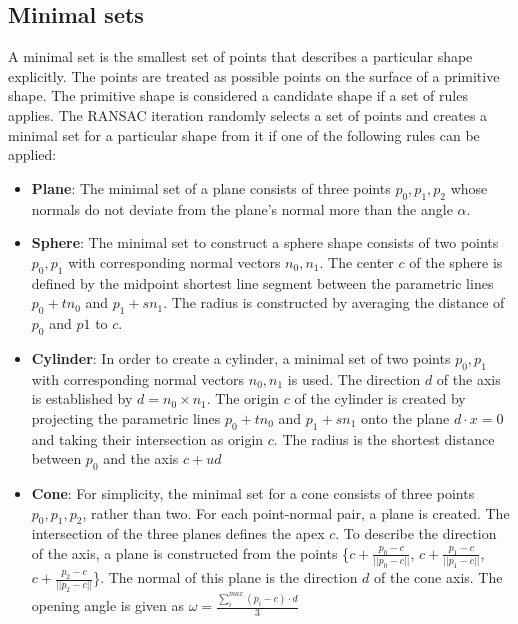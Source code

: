 \subsection{Minimal sets}
\label{sec:minimal_sets}

A minimal set is the smallest set of points that describes a particular shape explicitly. The points are treated as possible points on the surface of a primitive shape. The primitive shape is considered a candidate shape if a set of rules applies. The RANSAC iteration randomly selects a set of points and creates a minimal set for a particular shape from it if one of the following rules can be applied:
\begin{itemize}
    \item \textbf{Plane}: The minimal set of a plane consists of three points $p_0, p_1, p_2$ whose normals do not deviate from the plane's normal more than the angle $\alpha$. 
    
    \item \textbf{Sphere}: The minimal set to construct a sphere shape consists of two points $p_0, p_1$ with corresponding normal vectors $n_0, n_1$. The center $c$ of the sphere is defined by the midpoint shortest line segment between the parametric lines $p_0 + tn_0$ and $p_1 + sn_1$. The radius is constructed by averaging the distance of $p_0$ and $p1$ to $c$.

    \item \textbf{Cylinder}:
    In order to create a cylinder, a minimal set of two points  $p_0, p_1$ with corresponding normal vectors $n_0, n_1$ is used. The direction $d$ of the axis is established by $d = n_0 \times n_1$. The origin $c$ of the cylinder is created by projecting the parametric lines $p_0 + tn_0$ and $p_1 + sn_1$ onto the plane $d \cdot x = 0$ and taking their intersection as origin $c$. The radius is the shortest distance between $p_0$ and the axis $c + ud$
    
    \item \textbf{Cone}:
    For simplicity, the minimal set for a cone consists of three points $p_0, p_1, p_2$, rather than two. For each point-normal pair, a plane is created. The intersection of the three planes defines the apex $c$. To describe the direction of the axis, a plane is constructed from the points \{$c +  \frac{p_0 - c}{||p_0 - c||}$, $c +  \frac{p_1 - c}{||p_1 - c||}$, $c +  \frac{p_2 - c}{||p_2 - c||}$\}. The normal of this plane is the direction $d$ of the cone axis. The opening angle is given as $\omega = \frac{\sum_{i}^{max} (p_i - c)\cdot d}{3}$
    

\end{itemize}
